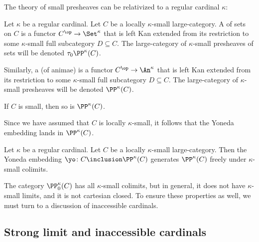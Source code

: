 The theory of small presheaves can be relativized
to a regular cardinal $ \kappa $:

\begin{definition}
	Let $ \kappa $ be a regular cardinal.
	Let $ C $ be a locally $ \kappa $-small large-category.
	A  of sets on $ C $
	is a functor $ C^{\op} \to \Set^{\kappa} $
	that is left Kan extended from its restriction to
	some $ \kappa $-small full subcategory $ D \subseteq C $.
	The large-category of $ \kappa $-small presheaves of sets
	will be denoted $ \tau_0\PP^{\kappa}(C) $.

	Similarly, a 
	(of animae) is a functor $ C^{\op} \to \An^{\kappa} $
	that is left Kan extended from its restriction to 
	some $ \kappa $-small full subcategory $ D \subseteq C $.
	The large-category of $ \kappa $-small presheaves
	will be denoted $ \PP^{\kappa}(C) $.
\end{definition}

\begin{nul}
	If $ C $ is small, then so is $ \PP^{\kappa}(C) $.

	Since we have assumed that $ C $ is locally $ \kappa $-small,
	it follows that the Yoneda embedding lands in $ \PP^{\kappa}(C) $.
\end{nul}

\begin{proposition}%
	\label{prp:PPkappaisfreelygenerated}
	Let $ \kappa $ be a regular cardinal.
	Let $ C $ be a locally $\kappa$-small large-category.
	Then the Yoneda embedding
	$ \yo \colon C \inclusion \PP^{\kappa}(C) $
	generates $ \PP^{\kappa}(C) $ freely under
	$ \kappa $-small colimits.
\end{proposition}

\begin{nul}
	The category $ \PP^{\kappa}_0(C) $
	has all $ \kappa $-small colimits, but
	in general, it does not have $ \kappa $-small limits, and
	it is not cartesian closed.
	To ensure these properties as well,
	we must turn to a discussion of inaccessible cardinals.
\end{nul}

\subsection{Strong limit and inaccessible cardinals}%
\label{sub:strong_limit_and_inaccessible_cardinals}

